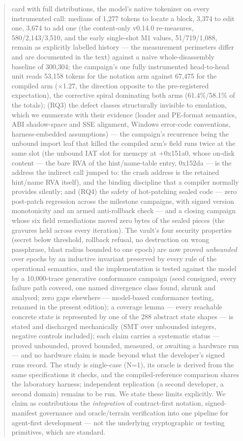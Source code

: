 \documentclass[11pt,a4paper]{article}
\begin{document}
\begin{abstract}
card with full distributions, the model's native tokenizer on every
instrumented call: medians of 1{,}277 tokens to locate a block, 3{,}374
to edit one, 3{,}674 to add one (the content-only v0.14.0 re-measures,
580/2{,}143/3{,}510, and the early single-shot M1 values, 51/719/1{,}088,
remain as explicitly labelled history --- the measurement perimeters
differ and are documented in the text) against a naive whole-disassembly
baseline of 300{,}304; the campaign's one fully instrumented
head-to-head unit reads 53{,}158 tokens for the notation arm against
67{,}475 for the compiled arm ($\times$1.27, the direction opposite to
the pre-registered expectation), the corrective spiral dominating both
arms (61.4\%/58.1\% of the totals);
(RQ3) the defect classes structurally invisible to emulation, which we
enumerate with their evidence (loader and PE-format semantics, ABI
shadow-space and SSE alignment, Windows error-code conventions,
harness-embedded assumptions) --- the campaign's recurrence being the
unbound import leaf that killed the compiled arm's field runs twice at
the same slot (the unbound IAT slot for memcpy at +0x151a0, whose
on-disk content --- the bare RVA of the hint/name-table entry, 0x152da
--- is the address the indirect call jumped to: the crash address is
the retained hint/name RVA itself), and the binding discipline that a
compiler normally provides silently; and (RQ4) the safety of hot-patching sealed
code --- zero post-patch regression across the milestone campaigns, with
signed version monotonicity and an armed anti-rollback check --- and a
closing campaign whose six field remediations moved zero bytes of the
sealed pieces (the gravures held across every iteration). The vault's four security properties (secret below threshold, rollback refusal, no destruction on wrong passphrase, blast radius bounded to one epoch) are now proved \emph{unbounded} over epochs by an inductive invariant preserved by every rule of the operational semantics, and the implementation is tested against the model by a 10{,}000-trace
generative conformance campaign (seed consigned, every failure path
covered, one named divergence class found, shrunk and analysed; zero gaps
elsewhere --- model-based conformance testing, renamed in the present
edition); a coverage lemma --- every reachable concrete state is
represented by one of the 288 abstract state shapes --- is stated and
discharged mechanically (SMT over unbounded integers, negative controls
included); each claim carries a systematic status --- proved unbounded,
proved bounded, measured, or awaiting a hardware run --- and no hardware
claim is made beyond what the developer's signed runs record. The study is
single-case (N=1), its oracle is derived from the same specifications it
checks, and the compiled-reference comparison shares the laboratory
harness; independent replication (a second developer, a second domain)
remains to be run. We state these limits explicitly. We claim as contributions the \emph{integration}
of contract-first notation, signed-manifest governance and oracle/terrain
verification into one pipeline for agent-first development --- not the
underlying cryptographic or testing primitives, which are standard.
\end{abstract}
\end{document}
